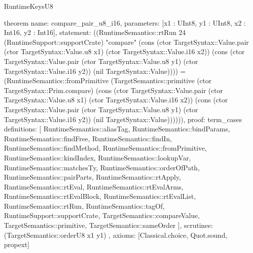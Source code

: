 \begin{lexlean}{RuntimeKeysU8}
\begin{semanticmodule}
theorem{
  name: compare_pair_u8_i16,
  parameters: [x1 : UInt8, y1 : UInt8, x2 : Int16, y2 : Int16],
  statement: ((RuntimeSemantics::rtRun 24 (RuntimeSupport::supportCrate) "compare" (cons (ctor TargetSyntax::Value.pair (ctor TargetSyntax::Value.u8 x1) (ctor TargetSyntax::Value.i16 x2)) (cons (ctor TargetSyntax::Value.pair (ctor TargetSyntax::Value.u8 y1) (ctor TargetSyntax::Value.i16 y2)) (nil TargetSyntax::Value)))) = (RuntimeSemantics::fromPrimitive (TargetSemantics::primitive (ctor TargetSyntax::Prim.compare) (cons (ctor TargetSyntax::Value.pair (ctor TargetSyntax::Value.u8 x1) (ctor TargetSyntax::Value.i16 x2)) (cons (ctor TargetSyntax::Value.pair (ctor TargetSyntax::Value.u8 y1) (ctor TargetSyntax::Value.i16 y2)) (nil TargetSyntax::Value)))))),
  proof: term_cases{
    definitions: [
      RuntimeSemantics::aliasTag,
      RuntimeSemantics::bindParams,
      RuntimeSemantics::findFree,
      RuntimeSemantics::findIn,
      RuntimeSemantics::findMethod,
      RuntimeSemantics::fromPrimitive,
      RuntimeSemantics::kindIndex,
      RuntimeSemantics::lookupVar,
      RuntimeSemantics::matchesTy,
      RuntimeSemantics::orderOfPath,
      RuntimeSemantics::pairParts,
      RuntimeSemantics::rtApply,
      RuntimeSemantics::rtEval,
      RuntimeSemantics::rtEvalArms,
      RuntimeSemantics::rtEvalBlock,
      RuntimeSemantics::rtEvalList,
      RuntimeSemantics::rtRun,
      RuntimeSemantics::tagOf,
      RuntimeSupport::supportCrate,
      TargetSemantics::compareValue,
      TargetSemantics::primitive,
      TargetSemantics::sameOrder
    ],
    scrutinee: (TargetSemantics::orderU8 x1 y1)
  },
  axioms: [Classical.choice, Quot.sound, propext]
}


\end{semanticmodule}
\end{lexlean}
